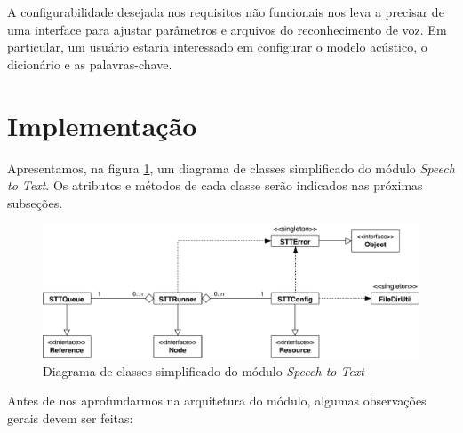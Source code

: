 A configurabilidade desejada nos requisitos não funcionais nos leva a precisar de uma interface para ajustar parâmetros e arquivos do reconhecimento de voz. Em particular, um usuário estaria interessado em configurar o modelo acústico, o dicionário e as palavras-chave.


\section{Implementação}

Apresentamos, na figura \ref{sttModuleClassDiagram}, um diagrama de classes simplificado do módulo \textit{Speech to Text}. Os atributos e métodos de cada classe serão indicados nas próximas subseções.

\begin{figure}[H]
  \centering
  \includegraphics[width=\textwidth]{image/stt-module-simple.pdf}
  \caption{Diagrama de classes simplificado do módulo \textit{Speech to Text}}
  \label{sttModuleClassDiagram}
\end{figure}

Antes de nos aprofundarmos na arquitetura do módulo, algumas observações gerais devem ser feitas:

